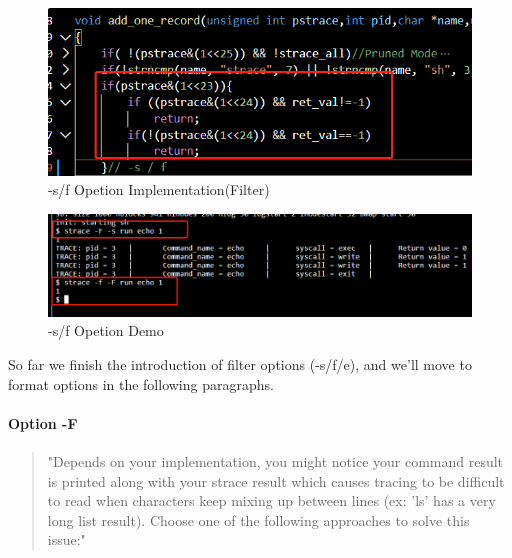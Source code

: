 \documentclass[11pt,oneside,a4paper]{article}
\begin{document}
\begin{figure}[H]
    \includegraphics[width=4.75in]{1-23.png}
    \centering
    \caption{-s/f Opetion Implementation(Filter)}
\end{figure}

\begin{figure}[H]
    \includegraphics[width=4.75in]{1-26.png}
    \centering
    \caption{-s/f Opetion Demo}
\end{figure}

So far we finish the introduction of filter options (-s/f/e), and we'll move to format 
options in the following paragraphs.

\paragraph*{Option -F}
\begin{quotation}
    "Depends on your implementation, you might notice your command result is printed along with your
strace result which causes tracing to be difficult to read when characters keep mixing up between lines
(ex: 'ls' has a very long list result). Choose one of the following approaches to solve this issue:"
\end{quotation}
\end{document}
